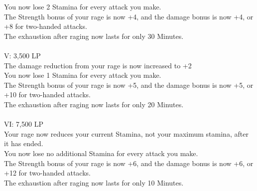 You now lose 2 Stamina for every attack you make.\\
The Strength bonus of your rage is now +4, and the damage bonus is now +4, or +8 for two-handed attacks.\\
The exhaustion after raging now lasts for only 30 Minutes.\\
\\
V: 3,500 LP\\
The damage reduction from your rage is now increased to +2\\
You now lose 1 Stamina for every attack you make.\\
The Strength bonus of your rage is now +5, and the damage bonus is now +5, or +10 for two-handed attacks.\\
The exhaustion after raging now lasts for only 20 Minutes.\\
\\
VI: 7,500 LP\\
Your rage now reduces your current Stamina, not your maximum stamina, after it has ended.\\
You now lose no additional Stamina for every attack you make.\\
The Strength bonus of your rage is now +6, and the damage bonus is now +6, or +12 for two-handed attacks.\\
The exhaustion after raging now lasts for only 10 Minutes.\\
\\